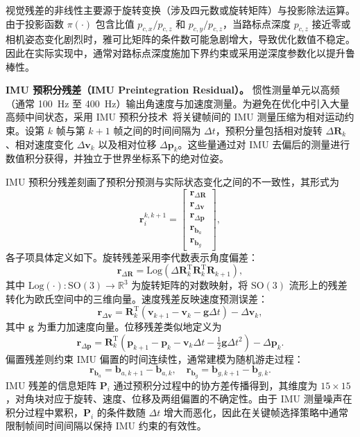 视觉残差的非线性主要源于旋转变换（涉及四元数或旋转矩阵）与投影除法运算。由于投影函数 $\pi(\cdot)$ 包含比值 $p_{c,x}/p_{c,z}$ 和 $p_{c,y}/p_{c,z}$，当路标点深度 $p_{c,z}$ 接近零或相机姿态变化剧烈时，雅可比矩阵的条件数可能急剧增大，导致优化数值不稳定。因此在实际实现中，通常对路标点深度施加下界约束或采用逆深度参数化以提升鲁棒性。

\textbf{IMU 预积分残差（IMU Preintegration Residual）。}
惯性测量单元以高频（通常 100~Hz 至 400~Hz）输出角速度与加速度测量。为避免在优化中引入大量高频中间状态，采用 IMU 预积分技术~\cite{forster2017onmanifold}将关键帧间的 IMU 测量压缩为相对运动约束。设第 $k$ 帧与第 $k+1$ 帧之间的时间间隔为 $\Delta t$，预积分量包括相对旋转 $\Delta\mathbf{R}_{k}$、相对速度变化 $\Delta\mathbf{v}_{k}$ 以及相对位移 $\Delta\mathbf{p}_{k}$。这些量通过对 IMU 去偏后的测量进行数值积分获得，并独立于世界坐标系下的绝对位姿。

IMU 预积分残差刻画了预积分预测与实际状态变化之间的不一致性，其形式为
\begin{equation}
    \mathbf{r}_{i}^{k,k+1} = \begin{bmatrix} \mathbf{r}_{\Delta\mathbf{R}} \\ \mathbf{r}_{\Delta\mathbf{v}} \\ \mathbf{r}_{\Delta\mathbf{p}} \\ \mathbf{r}_{\mathbf{b}_a} \\ \mathbf{r}_{\mathbf{b}_g} \end{bmatrix},
\end{equation}
各子项具体定义如下。旋转残差采用李代数表示角度偏差：
\begin{equation}
    \mathbf{r}_{\Delta\mathbf{R}} = \mathrm{Log}\!\left(\Delta\mathbf{R}_{k}^{\mathrm{T}}\mathbf{R}_{k}^{\mathrm{T}}\mathbf{R}_{k+1}\right),
\end{equation}
其中 $\mathrm{Log}(\cdot):\mathrm{SO}(3)\to\mathbb{R}^3$ 为旋转矩阵的对数映射，将 $\mathrm{SO}(3)$ 流形上的残差转化为欧氏空间中的三维向量。速度残差反映速度预测误差：
\begin{equation}
    \mathbf{r}_{\Delta\mathbf{v}} = \mathbf{R}_{k}^{\mathrm{T}}\!\left(\mathbf{v}_{k+1}-\mathbf{v}_{k}-\mathbf{g}\Delta t\right) - \Delta\mathbf{v}_{k},
\end{equation}
其中 $\mathbf{g}$ 为重力加速度向量。位移残差类似地定义为
\begin{equation}
    \mathbf{r}_{\Delta\mathbf{p}} = \mathbf{R}_{k}^{\mathrm{T}}\!\left(\mathbf{p}_{k+1}-\mathbf{p}_{k}-\mathbf{v}_{k}\Delta t-\tfrac{1}{2}\mathbf{g}\Delta t^2\right) - \Delta\mathbf{p}_{k}.
\end{equation}
偏置残差则约束 IMU 偏置的时间连续性，通常建模为随机游走过程：
\begin{equation}
    \mathbf{r}_{\mathbf{b}_a} = \mathbf{b}_{a,k+1}-\mathbf{b}_{a,k},\quad \mathbf{r}_{\mathbf{b}_g} = \mathbf{b}_{g,k+1}-\mathbf{b}_{g,k}.
\end{equation}
IMU 残差的信息矩阵 $\mathbf{P}_i$ 通过预积分过程中的协方差传播得到，其维度为 $15\times15$，对角块对应于旋转、速度、位移及两组偏置的不确定性。由于 IMU 测量噪声在积分过程中累积，$\mathbf{P}_i$ 的条件数随 $\Delta t$ 增大而恶化，因此在关键帧选择策略中通常限制帧间时间间隔以保持 IMU 约束的有效性。

